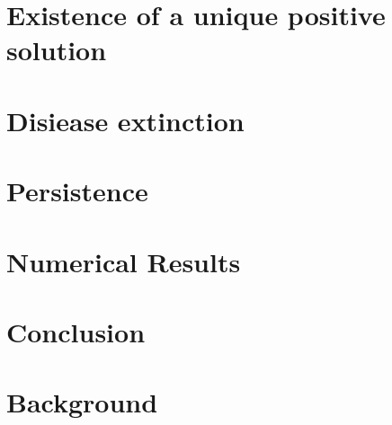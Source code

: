\documentclass[smallextended]{svjour3}
\begin{document}
	\section{Existence of a unique positive solution}
		\label{sec:solution_existence}
		
	\section{Disiease extinction}
		\label{extinction}
		
		
	\section{Persistence}
		\label{sec:persistence}
		
		
	\section{Numerical Results}
		\label{sec:numerics}
		
	\section{Conclusion}
		\label{sec:conclusion}
	\appendix
	\section{Background}
\end{document}
